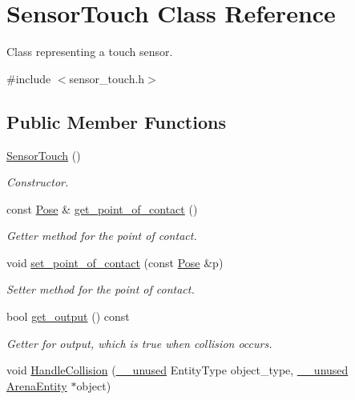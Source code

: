\hypertarget{class_sensor_touch}{}\section{Sensor\+Touch Class Reference}
\label{class_sensor_touch}


Class representing a touch sensor.  




{\ttfamily \#include $<$sensor\+\_\+touch.\+h$>$}

\subsection*{Public Member Functions}
\begin{DoxyCompactItemize}
\item 
\hyperlink{class_sensor_touch_ab8e0dc693ec2fbc1aa5ff25ee2bfdb19}{Sensor\+Touch} ()\hypertarget{class_sensor_touch_ab8e0dc693ec2fbc1aa5ff25ee2bfdb19}{}\label{class_sensor_touch_ab8e0dc693ec2fbc1aa5ff25ee2bfdb19}

\begin{DoxyCompactList}\small\item\em Constructor. \end{DoxyCompactList}\item 
const \hyperlink{struct_pose}{Pose} \& \hyperlink{class_sensor_touch_a9f56fd943758125611863ce2bc0d9365}{get\+\_\+point\+\_\+of\+\_\+contact} ()
\begin{DoxyCompactList}\small\item\em Getter method for the point of contact. \end{DoxyCompactList}\item 
void \hyperlink{class_sensor_touch_a2ef6d89a8e763e21f82e03a3033a490f}{set\+\_\+point\+\_\+of\+\_\+contact} (const \hyperlink{struct_pose}{Pose} \&p)
\begin{DoxyCompactList}\small\item\em Setter method for the point of contact. \end{DoxyCompactList}\item 
bool \hyperlink{class_sensor_touch_a6a2f77ea46d008f4a058bfb24db742e0}{get\+\_\+output} () const \hypertarget{class_sensor_touch_a6a2f77ea46d008f4a058bfb24db742e0}{}\label{class_sensor_touch_a6a2f77ea46d008f4a058bfb24db742e0}

\begin{DoxyCompactList}\small\item\em Getter for output, which is true when collision occurs. \end{DoxyCompactList}\item 
void \hyperlink{class_sensor_touch_a1980b126f7c6d0e6bdf75f1bb59fe5c2}{Handle\+Collision} (\hyperlink{common_8h_a2e3484535ee610c8e19e9859563abe48}{\+\_\+\+\_\+unused} Entity\+Type object\+\_\+type, \hyperlink{common_8h_a2e3484535ee610c8e19e9859563abe48}{\+\_\+\+\_\+unused} \hyperlink{class_arena_entity}{Arena\+Entity} $\ast$object)\hypertarget{class_sensor_touch_a1980b126f7c6d0e6bdf75f1bb59fe5c2}{}\label{class_sensor_touch_a1980b126f7c6d0e6bdf75f1bb59fe5c2}


\end{DoxyCompactItemize}
